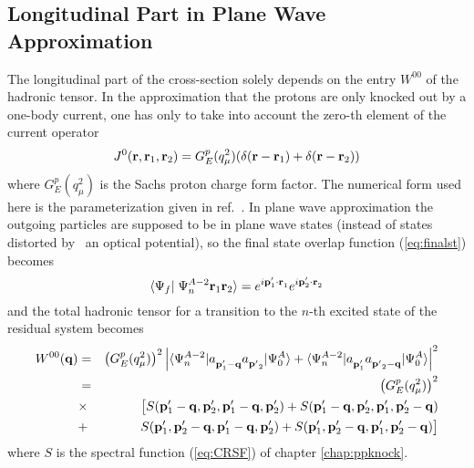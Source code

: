 \subsection{Longitudinal Part in Plane Wave Approximation}
The longitudinal part of the cross-section solely depends on the entry $W^{00}$ 
of the hadronic tensor. In the approximation that the protons are only knocked
out by a one-body current, one has only to take into account the zero-th
element of the current operator
%
	\begin{equation}
		J^0({\bf r}, {\bf r}_1,{\bf r}_2)
	=
		G^p_E( q_\mu^2 ) ( \delta( {\bf r}-{\bf r}_1)
		                  +\delta( {\bf r}-{\bf r}_2))
	\end{equation}
%
where $G^p_E( q_\mu^2 )$ is the Sachs proton charge form factor. 
The numerical form used here is the 
parameterization given in ref.~\cite{SSBW80}.
In plane wave approximation the outgoing particles are supposed to be in plane
wave states (instead of states distorted by \eg\ an optical potential), so
the final state overlap function (\ref{eq:finalst}) becomes
%
	\begin{equation}
		\inp< \Psi_f | \Psi^{A-2}_n \rvec{r}_1 \rvec{r}_2 >
	=	
		e^{i\rvec{p}'_1\cdot\rvec{r}\phpr_1} 
		e^{i\rvec{p}'_2\cdot\rvec{r}\phpr_2} 
	\label{eq:finalstpw}
	\end{equation}
%
and the total hadronic tensor for a transition to the $n$-th excited state of
the residual system becomes
%
	\begin{eqnarray}
		W^{00}(\rvec{q})
	&=&
		\left(G^p_E(q_\mu^2) \right)^2
		\left|
		\ME< \Psi^{A-2}_n | 
			\Oa{\rvec{p}'_1-\rvec{q}}\Oa{\rvec{p'}_2} 
		| \Psi^A_0 >
		+
		\ME< \Psi^{A-2}_n | 
			\Oa{\rvec{p}'_1}\Oa{\rvec{p'}_2-\rvec{q}} 
		| \Psi^A_0 >
		\right|^2
	\nonumber \\
	&=&
		\left( G^p_E(q_\mu^2) \right)^2
	\nonumber \\
	&\times&
	\big[
		S( \rvec{p}'_1-\rvec{q}, \rvec{p}'_2, 
		   \rvec{p}'_1-\rvec{q}, \rvec{p}'_2 )
		+
		S( \rvec{p}'_1-\rvec{q}, \rvec{p}'_2, 
                   \rvec{p}'_1, \rvec{p}'_2-\rvec{q} )
	\nonumber \\
	&+&
		S( \rvec{p}'_1, \rvec{p}'_2-\rvec{q}, 
                   \rvec{p}'_1-\rvec{q}, \rvec{p}'_2 )
		+
		S( \rvec{p}'_1, \rvec{p}'_2-\rvec{q}, 
                   \rvec{p}'_1, \rvec{p}'_2-\rvec{q} )
	\big]
	\label{eq:spect}
	\end{eqnarray}
%
where $S$ is the spectral function (\ref{eq:CRSF}) 
of chapter \ref{chap:ppknock}.
